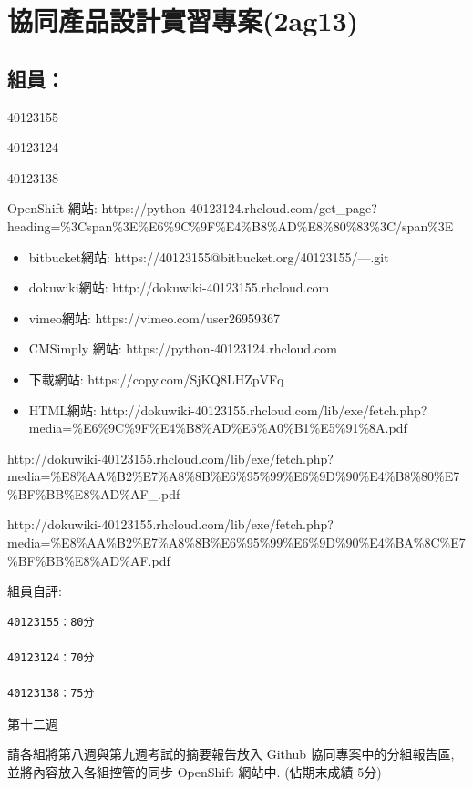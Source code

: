 \documentclass[]{article}
\begin{document}
\section{協同產品設計實習專案(2ag13)}\label{ux5354ux540cux7522ux54c1ux8a2dux8a08ux5be6ux7fd2ux5c08ux68482ag13}

\subsection{組員：}\label{ux7d44ux54e1-1}

40123155

40123124

40123138

OpenShift 網站:
https://python-40123124.rhcloud.com/get\_page?heading=\%3Cspan\%3E\%E6\%9C\%9F\%E4\%B8\%AD\%E8\%80\%83\%3C/span\%3E

\begin{itemize}
\item
  bitbucket網站: https://40123155@bitbucket.org/40123155/---.git
\item
  dokuwiki網站: http://dokuwiki-40123155.rhcloud.com
\item
  vimeo網站: https://vimeo.com/user26959367
\item
  CMSimply 網站: https://python-40123124.rhcloud.com
\item
  下載網站: https://copy.com/SjKQ8LHZpVFq
\item
  HTML網站:
  http://dokuwiki-40123155.rhcloud.com/lib/exe/fetch.php?media=\%E6\%9C\%9F\%E4\%B8\%AD\%E5\%A0\%B1\%E5\%91\%8A.pdf
\end{itemize}

http://dokuwiki-40123155.rhcloud.com/lib/exe/fetch.php?media=\%E8\%AA\%B2\%E7\%A8\%8B\%E6\%95\%99\%E6\%9D\%90\%E4\%B8\%80\%E7\%BF\%BB\%E8\%AD\%AF\_.pdf

http://dokuwiki-40123155.rhcloud.com/lib/exe/fetch.php?media=\%E8\%AA\%B2\%E7\%A8\%8B\%E6\%95\%99\%E6\%9D\%90\%E4\%BA\%8C\%E7\%BF\%BB\%E8\%AD\%AF.pdf

組員自評:

\begin{verbatim}
40123155：80分

40123124：70分

40123138：75分
\end{verbatim}

第十二週

請各組將第八週與第九週考試的摘要報告放入 Github 協同專案中的分組報告區,
並將內容放入各組控管的同步 OpenShift 網站中. (佔期末成績 5分)
\end{document}
